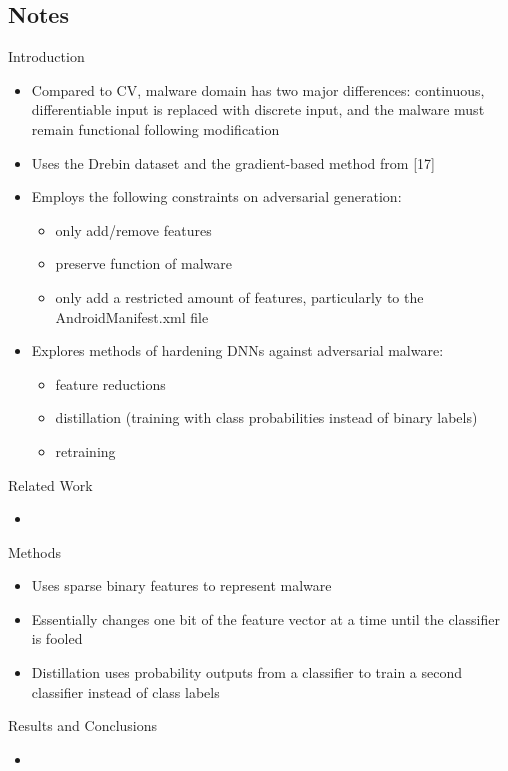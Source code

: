 \documentclass{article}
\begin{document}
\subsection*{Notes}

Introduction
\begin{itemize}
\item Compared to CV, malware domain has two major differences: continuous, differentiable input is replaced with discrete input, and the malware must remain functional following modification
\item Uses the Drebin dataset and the gradient-based method from [17]
\item Employs the following constraints on adversarial generation:
	\begin{itemize}
	\item only add/remove features
	\item preserve function of malware
	\item only add a restricted amount of features, particularly to the AndroidManifest.xml file
	\end{itemize}
\item Explores methods of hardening DNNs against adversarial malware:
	\begin{itemize}
	\item feature reductions
	\item distillation (training with class probabilities instead of binary labels)
	\item retraining
	\end{itemize}
\end{itemize}
Related Work
\begin{itemize}
\item
\end{itemize}
Methods
\begin{itemize}
\item Uses sparse binary features to represent malware
\item Essentially changes one bit of the feature vector at a time until the classifier is fooled
\item Distillation uses probability outputs from a classifier to train a second classifier instead of class labels
\end{itemize}
Results and Conclusions
\begin{itemize}
\item
\end{itemize}

\pagebreak
\end{document}
